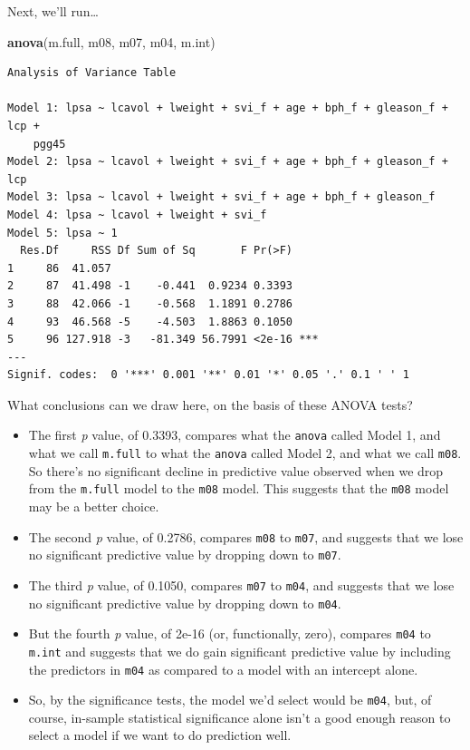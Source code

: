 \documentclass[]{book}
\newenvironment{Shaded}{\begin{snugshade}}{\end{snugshade}}
\newcommand{\KeywordTok}[1]{\textcolor[rgb]{0.13,0.29,0.53}{\textbf{#1}}}
\newcommand{\NormalTok}[1]{#1}
\providecommand{\tightlist}{%
  \setlength{\itemsep}{0pt}\setlength{\parskip}{0pt}}
\theoremstyle{definition}
\theoremstyle{definition}
\theoremstyle{definition}
\theoremstyle{remark}
\begin{document}
Next, we'll run\ldots{}

\begin{Shaded}
\begin{Highlighting}[]
\KeywordTok{anova}\NormalTok{(m.full, m08, m07, m04, m.int)}
\end{Highlighting}
\end{Shaded}

\begin{verbatim}
Analysis of Variance Table

Model 1: lpsa ~ lcavol + lweight + svi_f + age + bph_f + gleason_f + lcp + 
    pgg45
Model 2: lpsa ~ lcavol + lweight + svi_f + age + bph_f + gleason_f + lcp
Model 3: lpsa ~ lcavol + lweight + svi_f + age + bph_f + gleason_f
Model 4: lpsa ~ lcavol + lweight + svi_f
Model 5: lpsa ~ 1
  Res.Df     RSS Df Sum of Sq       F Pr(>F)    
1     86  41.057                                
2     87  41.498 -1    -0.441  0.9234 0.3393    
3     88  42.066 -1    -0.568  1.1891 0.2786    
4     93  46.568 -5    -4.503  1.8863 0.1050    
5     96 127.918 -3   -81.349 56.7991 <2e-16 ***
---
Signif. codes:  0 '***' 0.001 '**' 0.01 '*' 0.05 '.' 0.1 ' ' 1
\end{verbatim}

What conclusions can we draw here, on the basis of these ANOVA tests?

\begin{itemize}
\tightlist
\item
  The first \emph{p} value, of 0.3393, compares what the \texttt{anova}
  called Model 1, and what we call \texttt{m.full} to what the
  \texttt{anova} called Model 2, and what we call \texttt{m08}. So
  there's no significant decline in predictive value observed when we
  drop from the \texttt{m.full} model to the \texttt{m08} model. This
  suggests that the \texttt{m08} model may be a better choice.
\item
  The second \emph{p} value, of 0.2786, compares \texttt{m08} to
  \texttt{m07}, and suggests that we lose no significant predictive
  value by dropping down to \texttt{m07}.
\item
  The third \emph{p} value, of 0.1050, compares \texttt{m07} to
  \texttt{m04}, and suggests that we lose no significant predictive
  value by dropping down to \texttt{m04}.
\item
  But the fourth \emph{p} value, of 2e-16 (or, functionally, zero),
  compares \texttt{m04} to \texttt{m.int} and suggests that we do gain
  significant predictive value by including the predictors in
  \texttt{m04} as compared to a model with an intercept alone.
\item
  So, by the significance tests, the model we'd select would be
  \texttt{m04}, but, of course, in-sample statistical significance alone
  isn't a good enough reason to select a model if we want to do
  prediction well.
\end{itemize}
\end{document}
